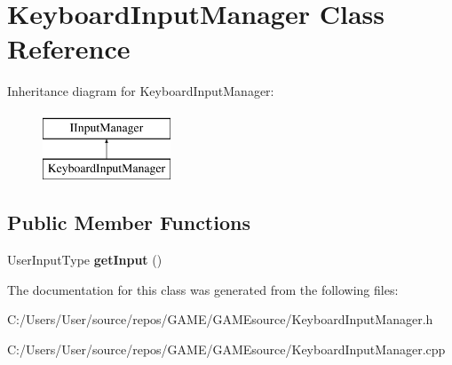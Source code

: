 \hypertarget{class_keyboard_input_manager}{}\section{Keyboard\+Input\+Manager Class Reference}
\label{class_keyboard_input_manager}
Inheritance diagram for Keyboard\+Input\+Manager\+:\begin{figure}[H]
\begin{center}
\leavevmode
\includegraphics[height=2.000000cm]{class_keyboard_input_manager}
\end{center}
\end{figure}
\subsection*{Public Member Functions}
\begin{DoxyCompactItemize}
\item 
\mbox{\label{class_keyboard_input_manager_a8cb1844b5ac0c023294a6a2378440c92}} 
User\+Input\+Type {\bfseries get\+Input} ()
\end{DoxyCompactItemize}


The documentation for this class was generated from the following files\+:\begin{DoxyCompactItemize}
\item 
C\+:/\+Users/\+User/source/repos/\+G\+A\+M\+E/\+G\+A\+M\+Esource/Keyboard\+Input\+Manager.\+h\item 
C\+:/\+Users/\+User/source/repos/\+G\+A\+M\+E/\+G\+A\+M\+Esource/Keyboard\+Input\+Manager.\+cpp\end{DoxyCompactItemize}
